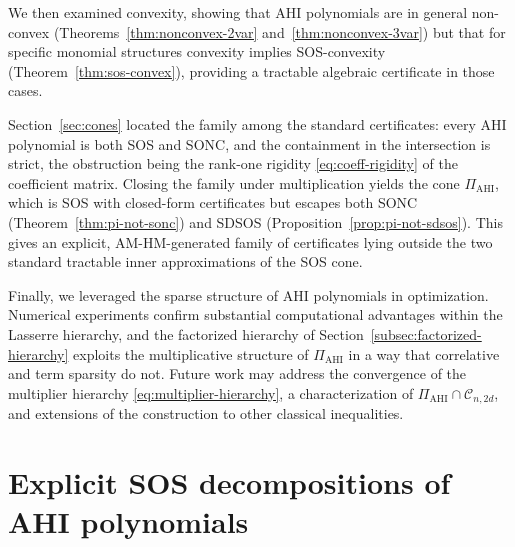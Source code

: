 \documentclass[12pt]{elsarticle}
\theoremstyle{definition}
\newcommand{\AHI}{\mathrm{AHI}}
\newcommand{\PiAHI}{\Pi_{\AHI}}
\newcommand{\SONC}{\mathcal{C}}
\begin{document}
We then examined convexity, showing that AHI polynomials are in general non-convex (Theorems~\ref{thm:nonconvex-2var} and~\ref{thm:nonconvex-3var}) but that for specific monomial structures convexity implies SOS-convexity (Theorem~\ref{thm:sos-convex}), providing a tractable algebraic certificate in those cases.

Section~\ref{sec:cones} located the family among the standard certificates: every AHI polynomial is both SOS and SONC, and the containment in the intersection is strict, the obstruction being the rank-one rigidity \eqref{eq:coeff-rigidity} of the coefficient matrix. Closing the family under multiplication yields the cone $\PiAHI$, which is SOS with closed-form certificates but escapes both SONC (Theorem~\ref{thm:pi-not-sonc}) and SDSOS (Proposition~\ref{prop:pi-not-sdsos}). This gives an explicit, AM-HM-generated family of certificates lying outside the two standard tractable inner approximations of the SOS cone.

Finally, we leveraged the sparse structure of AHI polynomials in optimization. Numerical experiments confirm substantial computational advantages within the Lasserre hierarchy, and the factorized hierarchy of Section~\ref{subsec:factorized-hierarchy} exploits the multiplicative structure of $\PiAHI$ in a way that correlative and term sparsity do not. Future work may address the convergence of the multiplier hierarchy \eqref{eq:multiplier-hierarchy}, a characterization of $\PiAHI\cap\SONC_{n,2d}$, and extensions of the construction to other classical inequalities.




\pagebreak
\appendix

\section{Explicit SOS decompositions of AHI polynomials}\label{app:sos-table}
\end{document}
